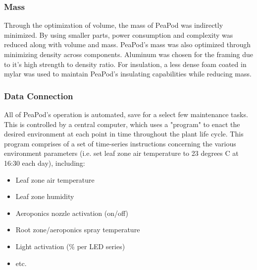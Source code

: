 \documentclass{report}
\begin{document}
\subsubsection{Mass} 
\label{sec:constraints-mass}

Through the optimization of volume, the mass of PeaPod was indirectly minimized. By using smaller parts, power consumption and complexity was reduced along with volume and mass. PeaPod's mass was also optimized through minimizing density across components. Aluminum was chosen for the framing due to it's high strength to density ratio. For insulation, a less dense foam coated in mylar was used to maintain PeaPod's insulating capabilities while reducing mass.

\subsubsection{Data Connection} 
\label{sec:constraints-data}



All of PeaPod's operation is automated, save for a select few maintenance tasks. This is controlled by a central computer, which uses a "program" to enact the desired environment at each point in time throughout the plant life cycle. This program comprises of a set of time-series instructions concerning the various environment parameters (i.e. set leaf zone air temperature to 23 degrees C at 16:30 each day), including:
\begin{itemize}
    \item Leaf zone air temperature
    \item Leaf zone humidity
    \item Aeroponics nozzle activation (on/off)
    \item Root zone/aeroponics spray temperature
    \item Light activation (\% per LED series)
    \item etc.
\end{itemize}
\end{document}
